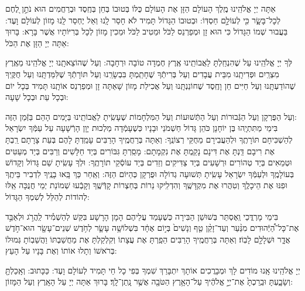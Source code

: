 \documentclass[a4paper, twoside, openany, parskip=half, 10pt]{article}
\begin{document}
\begin{multicols}{3}
אַתָּה יְיָ אֱלֹהֵֽינוּ מֶֽלֶךְ הָעוֹלָם הַזָּן אֶת הָעוֹלָם כֻּלּוֹ בְּטוּבוֹ בְּחֵן בְּחֶֽסֶד וּבְרַחֲמִים הוּא נֹתֵ֣ן לֶ֭חֶם לְכָל־בָּשָׂ֑ר כִּ֖י לְעוֹלָ֣ם חַסְדּֽוֹ: וּבְטוּבוֹ הַגָּדוֹל תָּמִיד לֹא חָסַר לָֽנוּ וְאַל יֶחְסַר לָֽנוּ מָזוֹן לְעוֹלָם וָעֶד: בַּעֲבוּר שְׁמוֹ הַגָּדוֹל כִּי הוּא זָן וּמְפַרְנֵס לַכֹּל וּמֵטִיב לַכֹּל וּמֵכִין מָזוֹן לְכָל בְּרִיּוֹתָיו אֲשֶׁר בָּרָא: בָּרוּךְ אַתָּה יְיָ הַזָּן אֶת הַכֹּל:
	
	לְּךָ יְיָ אֱלֹהֵֽינוּ עַל שֶׁהִנְחַֽלְתָּ לַאֲבוֹתֵֽינוּ אֶֽרֶץ חֶמְדָה טוֹבָה וּרְחָבָה: וְעַל שֶׁהוֹצֵאתָֽנוּ יְיָ אֱלֹהֵֽינוּ מֵאֶֽרֶץ מִצְרַֽיִם וּפְדִיתָֽנוּ מִבֵּית עֲבָדִים וְעַל בְּרִיתְֿךָ שֶׁחָתַֽמְתָּ בִּבְשָׂרֵֽנוּ וְעַל תּוֹרָתְֿךָ שֶׁלִּמַּדְתָּֽנוּ וְעַל חֻקֶּֽיךָ שֶׁהוֹדַעְתָּֽנוּ וְעַל חַיִּים חֵן וָחֶֽסֶד שֶׁחוֹנַנְתָּֽנוּ וְעַל אֲכִילַת מָזוֹן שָׁאַתָּה זָן וּמְפַרְנֵס אוֹתָֽנוּ תָּמִיד בְּכָל יוֹם וּבְכָל עֵת וּבְכָל שָׁעָה:

\begin{sometimes}
 וְעַל הַפֻּרְקָן וְעַל הַגְּֿבוּרוֹת וְעַל הַתְּֿשׁוּעוֹת וְעַל הַמִּלְחָמוֹת שֶׁעָשִֽׂיתָ לַאֲבוֹתֵֽינוּ בַּיָּמִים הָהֵם בַּזְּֿמַן הַזֶּה:\\
בִּימֵי מַתִּתְיָֽהוּ בֶּן יוֹחָנָן כֹּהֵן גָּדוֹל חַשְׁמֹנַי וּבָנָיו כְּשֶׁעָמְֿדָה מַלְכוּת יָוָן הָרְֿשָׁעָה עַל עַמְּֿךָ יִשְׂרָאֵל לְהַשְׁכִּיחָם תּוֹרָתֶֽךָ וּלְהַעֲבִירָם מֵחֻקֵּי רְצוֹנֶֽךָ: וְאַתָּה בְּרַחֲמֶֽיךָ הָרַבִּים עָמַֽדְתָּ לָהֶם בְּעֵת צָרָתָם רַֽבְתָּ אֶת רִיבָם דַּֽנְתָּ אֶת דִּינָם נָקַֽמְתָּ אֶת נִקְמָתָם: מָסַֽרְתָּ גִּבּוֹרִים בְּיַד חַלָּשִׁים וְרַבִּים בְּיַד מְעַטִּים וּטְמֵאִים בְּיַד טְהוֹרִים וּרְשָׁעִים בְּיַד צַדִּיקִים וְזֵדִים בְּיַד עוֹסְֿקֵי תוֹרָתֶֽךָ: וּלְךָ עָשִֽׂיתָ שֵׁם גָּדוֹל וְקָדוֹשׁ בְּעוֹלָמֶֽךָ וּלְעַמְּֿךָ יִשְׂרָאֵל עָשִֽׂיתָ תְּשׁוּעָה גְדוֹלָה וּפֻרְקָן כְּהַיּוֹם הַזֶּה: וְאַֽחַר כַּךְ בָּֽאוּ בָנֶֽיךָ לִדְבִיר בֵּיתֶֽךָ וּפִנּוּ אֶת הֵיכָלֶֽךָ וְטִהֲרוּ אֶת מִקְדָּשֶֽׁךָ וְהִדְלִֽיקוּ נֵרוֹת בְּחַצְרוֹת קָדְּֿשֶֽׁךָ וְקָבְֿעוּ שְׁמוֹנַת יְמֵי חֲנֻכָּה אֵֽלּוּ לְהוֹדוֹת לְהַלֵּל לְשִׁמְךָ הַגָּדוֹל: 

בִּימֵי מָרְדֳּכַי וְִאֶסְתֵּר בְּשׁוּשַׁן הַבִּירָה כְּשֶׁעָמַד עֲלֵיהֶם הָמָן הָרָשָׁע בִּקֵּשׁ
 לְהַשְׁמִ֡יד לַֽהֲרֹ֣ג וּלְאַבֵּ֣ד אֶת־כָּל־הַ֠יְּֿהוּדִים מִנַּ֨עַר וְעַד־זָקֵ֨ן טַ֤ף וְנָשִׁים֙ בְּי֣וֹם אֶחָ֔ד בִּשְׁלוֹשָׁ֥ה עָשָׂ֛ר לְחֹ֥דֶשׁ שְׁנֵים־עָשָׂ֖ר הוּא־חֹ֣דֶשׁ אֲדָ֑ר וּשְׁלָלָ֖ם לָבֽוֹז׃ וְאַתָּה בְּרַחֲמֶֽיךָ הָרַבִּים הֵפַֽרְתָּ אֶת עֲצָתוֹ וְקִלְקַלְתָּ אֶת מַחֲשַׁבְתּוֹ וַהֲשֵׁבֽוֹתָ גְּמוּלוֹ בְּרֹאשׁוֹ וְתָלוּ אוֹתוֹ וְאֶת בָּנָיו עַל הָעֵץ:

\end{sometimes}

 יְיָ אֱלֹהֵֽינוּ אָֽנוּ מוֹדִים לָךְ וּמְבָרֲכִים אוֹתָךְ יִתְבָּרַךְ שִׁמְךָ בְּפִי כָל חַי תָּמִיד לְעוֹלָם וָעֶד: כַּכָּתוּב: וְאָֽכַלְתָּ֖ וְשָׂבָ֑עְתָּ וּבֵֽרַכְתָּ֙ אֶת־יְיָ֣ אֱלֹהֶ֔יךָ עַל־הָאָ֥רֶץ הַטֹּבָ֖ה אֲשֶׁ֥ר נָֽתַן־לָֽךְ׃ בָּרוּךְ אַתָּה יְיָ עַל הָאָֽרֶץ וְעַל הַמָּזוֹן:


\end{multicols}
\end{document}
